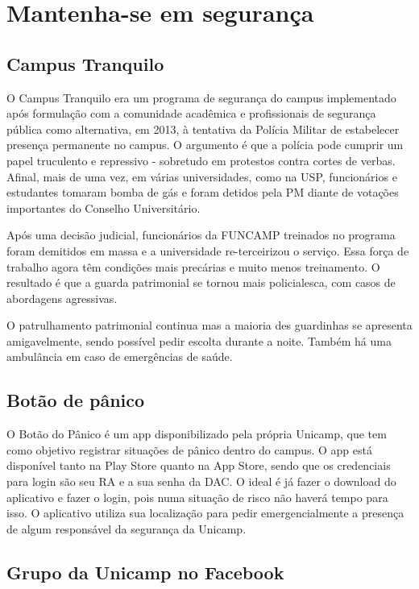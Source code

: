 \section{Mantenha-se em segurança}

\subsection{Campus Tranquilo}

O Campus Tranquilo era um programa de segurança do campus implementado após
formulação com a comunidade acadêmica e profissionais de segurança pública como
alternativa, em 2013, à tentativa da Polícia Militar de estabelecer presença permanente
no campus. O argumento é que a polícia pode cumprir um papel truculento e repressivo
- sobretudo em protestos contra cortes de verbas. Afinal, mais de uma vez, em várias
universidades, como na USP, funcionários e estudantes tomaram bomba de gás e foram
detidos pela PM diante de votações importantes do Conselho Universitário.

Após uma decisão judicial, funcionários da FUNCAMP treinados no programa foram
demitidos em massa e a universidade re-terceirizou o serviço. Essa força de trabalho
agora têm condições mais precárias e muito menos treinamento. O resultado é que a
guarda patrimonial se tornou mais policialesca, com casos de abordagens agressivas.

O patrulhamento patrimonial continua mas a maioria des guardinhas se apresenta
amigavelmente, sendo possível pedir escolta durante a noite. Também há uma
ambulância em caso de emergências de saúde.

\subsection{Botão de pânico}

O Botão do Pânico é um app disponibilizado pela própria Unicamp, que tem como
objetivo registrar situações de pânico dentro do campus. O app está disponível tanto na
Play Store quanto na App Store, sendo que os credenciais para login são seu RA e a sua
senha da DAC. O ideal é já fazer o download do aplicativo e fazer o login, pois numa
situação de risco não haverá tempo para isso. O aplicativo utiliza sua localização para
pedir emergencialmente a presença de algum responsável da segurança da Unicamp.

\subsection{Grupo da Unicamp no Facebook}

